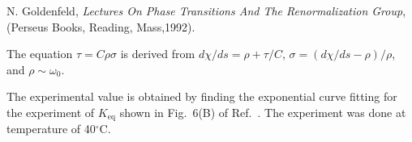 \documentclass[pre,showpacs,twocolumn,superscriptaddress]{revtex4}
\begin{document}
\begin{thebibliography}{99}
N. Goldenfeld,
{\it 
Lectures On Phase Transitions And The Renormalization Group},
(Perseus Books, Reading, Mass,1992).

The equation $\tau=C \rho \sigma$
is derived from
$d\chi/ds=\rho+\tau/C$,
$\sigma=(d\chi/ds-\rho)/\rho$,
and 
$\rho \sim \omega_0$.


The experimental value is obtained by 
finding the exponential curve fitting for
the experiment of $K_\text{eq}$ shown in Fig.~6(B) of Ref.~\cite{BZtrans}.
The experiment was done at temperature of 40$^\circ$C.






\end{thebibliography}
\end{document}
